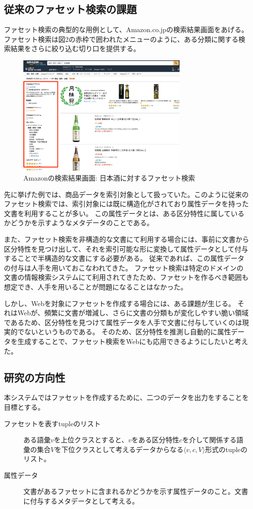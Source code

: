 \documentclass[a4j,10pt, twocolumn]{jarticle} \usepackage[dvipdfmx]{graphicx} \usepackage{amssymb} \usepackage{amsmath}
\begin{document}
\subsection{従来のファセット検索の課題}
 ファセット検索の典型的な用例として、Amazon.co.jp\cite{amazon}の検索結果画面をあげる。ファセット検索は図2の赤枠で囲われたメニューのように、ある分類に関する検索結果をさらに絞り込む切り口を提供する。
 \begin{figure}[ht]
   \includegraphics[width=85mm]{./amazon.png}
   \caption{Amazonの検索結果画面: 日本酒に対するファセット検索}
 \end{figure}
  先に挙げた例では、商品データを索引対象として扱っていた。このように従来のファセット検索では、索引対象には既に構造化がされており属性データを持った文書を利用することが多い。
  この属性データとは、ある区分特性に属しているかどうかを示すようなメタデータのことである。

  また、ファセット検索を非構造的な文書にて利用する場合には、事前に文書から区分特性を見つけ出して、それを索引可能な形に変換して属性データとして付与することで半構造的な文書にする必要がある。
  従来であれば、この属性データの付与は人手を用いておこなわれてきた。
  ファセット検索は特定のドメインの文書の情報検索システムにて利用されてきたため、ファセットを作るべき範囲も想定でき、人手を用いることが問題になることはなかった。

  しかし、Webを対象にファセットを作成する場合には、ある課題が生じる。
  それはWebが、頻繁に文書が増減し、さらに文書の分類もが変化しやすい脆い領域であるため、区分特性を見つけて属性データを人手で文書に付与していくのは現実的でないというものである。
  そのため、区分特性を推測し自動的に属性データを生成することで、ファセット検索をWebにも応用できるようにしたいと考えた。

\subsection{研究の方向性}
本システムではファセットを作成するために、二つのデータを出力をすることを目標とする。
\begin{description}
  \item[ファセットを表すtupleのリスト] ある語彙$v$を上位クラスとすると、$v$をある区分特性$c$を介して関係する語彙の集合$V$を下位クラスとして考えるデータからなる$\langle v, c, V\rangle$形式のtupleのリスト。
  \item[属性データ] 文書があるファセットに含まれるかどうかを示す属性データのこと。文書に付与するメタデータとして考える。
\end{description}
\end{document}
